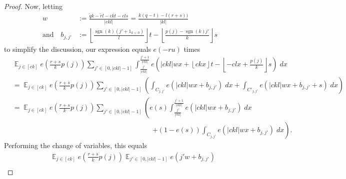 \documentclass[11pt]{amsart}
\theoremstyle{definition}
\DeclareMathOperator*{\E}{\mathbb{E}}
\newcommand{\1}{{\mathbf{1}}}
\DeclareMathOperator{\sgn}{sgn}
\newcommand{\bigbrac}[1]{\bigl( #1 \bigr)}
\newcommand{\floor}[1]{{\left \lfloor #1 \right \rfloor}}
\begin{document}
\begin{proof}


Now, letting
\begin{align*}
  w &:= {\frac{\tilde{q}k - \tilde{r}l-ckt-cls}{|ckl|} = \frac{k(q-t)-l(r+s))}{|kl|}}\\
  \textrm{and} \quad b_{j, j'} &:=\floor{\frac{\sgn(k)(j' +1_{k<0})}{l}}t-\floor{\frac{p(j)-\sgn(k)j'}{k}}s  
\end{align*}
 to simplify the discussion, our expression equals $e(-ru)$ times  
\begin{align*}
    & \E_{j\in[ck]}e\left(\frac{{r+s}}{k}p(j)\right)\sum_{j'\in[0, |ckl|-1]}\int_{\frac{j'}{|ckl|}}^{\frac{j'+1}{|ckl|}} e\left({|ckl|}wx  +\floor{ckx}t-\floor{-clx + \frac{p(j)}{k}}s\right)\; dx\\
    &=\E_{j\in[ck]}e\left(\frac{{r+s}}{k}p(j)\right)\sum_{j'\in[0, |ckl|-1]}\left(\int_{C_{j,j'}} e({|ckl|}wx  +b_{j,j'})\; dx+\int_{C'_{j,j'}} e\left({|ckl|}wx  +b_{j,j'}+s\right)\; dx\right)\\
    &=\E_{j\in[ck]}e\left(\frac{{r+s}}{k}p(j)\right)\sum_{j'\in[0, |ckl|-1]}\left(e(s)\int_{\frac{j'}{|ckl|}}^{\frac{j'+1}{|ckl|}} e({|ckl|}wx  +b_{j,j'})\; dx\right.\\
    &\qquad\qquad\qquad\qquad\qquad\qquad\qquad\qquad\qquad\qquad\left.+(1-e(s))\int_{C_{j,j'}} e\left({|ckl|}wx  +b_{j,j'}\right)\; dx\right).
    \end{align*}
Performing the change of variables, this equals
\begin{align*}
    &\E_{j\in[ck]}e\left(\frac{{r+s}}{k}p(j)\right)\E_{j'\in[0, |ckl|-1]}e\left({j'w}+b_{j,j'}\right)\\

\end{align*}
\end{proof}
\end{document}
